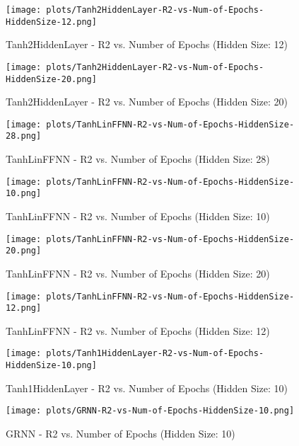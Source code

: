 \begin{figure}[H]
    \centering
    \texttt{[image: plots/Tanh2HiddenLayer-R2-vs-Num-of-Epochs-HiddenSize-12.png]}
    \caption{Tanh2HiddenLayer - R2 vs. Number of Epochs (Hidden Size: 12)}
\end{figure}

\begin{figure}[H]
    \centering
    \texttt{[image: plots/Tanh2HiddenLayer-R2-vs-Num-of-Epochs-HiddenSize-20.png]}
    \caption{Tanh2HiddenLayer - R2 vs. Number of Epochs (Hidden Size: 20)}
\end{figure}

\begin{figure}[H]
    \centering
    \texttt{[image: plots/TanhLinFFNN-R2-vs-Num-of-Epochs-HiddenSize-28.png]}
    \caption{TanhLinFFNN - R2 vs. Number of Epochs (Hidden Size: 28)}
\end{figure}

\begin{figure}[H]
    \centering
    \texttt{[image: plots/TanhLinFFNN-R2-vs-Num-of-Epochs-HiddenSize-10.png]}
    \caption{TanhLinFFNN - R2 vs. Number of Epochs (Hidden Size: 10)}
\end{figure}

\begin{figure}[H]
    \centering
    \texttt{[image: plots/TanhLinFFNN-R2-vs-Num-of-Epochs-HiddenSize-20.png]}
    \caption{TanhLinFFNN - R2 vs. Number of Epochs (Hidden Size: 20)}
\end{figure}

\begin{figure}[H]
    \centering
    \texttt{[image: plots/TanhLinFFNN-R2-vs-Num-of-Epochs-HiddenSize-12.png]}
    \caption{TanhLinFFNN - R2 vs. Number of Epochs (Hidden Size: 12)}
\end{figure}

\begin{figure}[H]
    \centering
    \texttt{[image: plots/Tanh1HiddenLayer-R2-vs-Num-of-Epochs-HiddenSize-10.png]}
    \caption{Tanh1HiddenLayer - R2 vs. Number of Epochs (Hidden Size: 10)}
\end{figure}

\begin{figure}[H]
    \centering
    \texttt{[image: plots/GRNN-R2-vs-Num-of-Epochs-HiddenSize-10.png]}
    \caption{GRNN - R2 vs. Number of Epochs (Hidden Size: 10)}
\end{figure}

